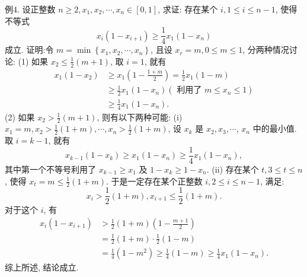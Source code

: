 例4. 设正整数 $n \geqslant 2, x_1, x_2, \cdots, x_n \in[0,1]$, 求证: 存在某个 $i, 1 \leqslant i \leqslant n-1$, 使得不等式
$$
x_i\left(1-x_{i+1}\right) \geqslant \frac{1}{4} x_1\left(1-x_n\right)
$$
成立.
证明:令 $m=\min \left\{x_1, x_2, \cdots, x_n\right\}$, 且设 $x_r=m, 0 \leqslant m \leqslant 1$, 分两种情况讨论:
(1) 如果 $x_2 \leqslant \frac{1}{2}(m+1)$, 取 $i=1$, 就有
$$
\begin{aligned}
x_1\left(1-x_2\right) & \geqslant x_1\left(1-\frac{1+m}{2}\right)=\frac{1}{2} x_1(1-m) \\
& \geqslant \frac{1}{2} x_1\left(1-x_n\right)\left(\text { 利用了 } m \leqslant x_n \leqslant 1\right) \\
& \geqslant \frac{1}{4} x_1\left(1-x_n\right) .
\end{aligned}
$$
(2) 如果 $x_2>\frac{1}{2}(m+1)$, 则有以下两种可能:
(i) $x_1=m, x_2>\frac{1}{2}(1+m), \cdots, x_n>\frac{1}{2}(1+m)$, 设 $x_k$ 是 $x_2, x_3, \cdots$, $x_n$ 中的最小值.
取 $i=k-1$, 就有
$$
x_{k-1}\left(1-x_k\right) \geqslant x_1\left(1-x_n\right) \geqslant \frac{1}{4} x_1\left(1-x_n\right),
$$
其中第一个不等号利用了 $x_{k-1} \geqslant x_1$ 及 $1-x_k \geqslant 1-x_n$.
(ii) 存在某个 $t, 3 \leqslant t \leqslant n$, 使得 $x_t=m \leqslant \frac{1}{2}(1+m)$.
于是一定存在某个正整数 $i, 2 \leqslant i \leqslant n-1$, 满足:
$$
x_i>\frac{1}{2}(1+m), x_{i+1} \leqslant \frac{1}{2}(1+m) .
$$
对于这个 $i$, 有
$$
\begin{aligned}
x_i\left(1-x_{i+1}\right) & >\frac{1}{2}(1+m)\left(1-\frac{m+1}{2}\right) \\
& =\frac{1}{2}(1+m) \cdot \frac{1}{2}(1-m) \\
& =\frac{1}{4}\left(1-m^2\right) \geqslant \frac{1}{4}(1-m) \geqslant \frac{1}{4} x_1\left(1-x_n\right) .
\end{aligned}
$$
综上所述, 结论成立.



